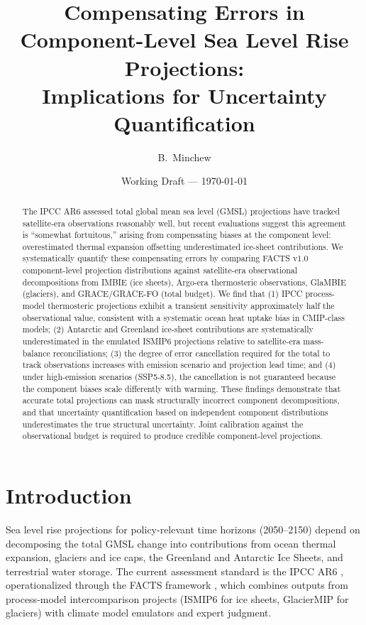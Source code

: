 \documentclass[11pt]{article}
\title{Compensating Errors in Component-Level Sea Level Rise Projections:\\
  Implications for Uncertainty Quantification}
\author{B.\ Minchew}
\date{Working Draft --- \today}
\begin{document}
\maketitle

\begin{abstract}
The IPCC AR6 assessed total global mean sea level (GMSL) projections have tracked satellite-era observations reasonably well, but recent evaluations suggest this agreement is ``somewhat fortuitous,'' arising from compensating biases at the component level: overestimated thermal expansion offsetting underestimated ice-sheet contributions.  We systematically quantify these compensating errors by comparing FACTS v1.0 component-level projection distributions against satellite-era observational decompositions from IMBIE (ice sheets), Argo-era thermosteric observations, GlaMBIE (glaciers), and GRACE/GRACE-FO (total budget).  We find that (1) IPCC process-model thermosteric projections exhibit a transient sensitivity approximately half the observational value, consistent with a systematic ocean heat uptake bias in CMIP-class models; (2) Antarctic and Greenland ice-sheet contributions are systematically underestimated in the emulated ISMIP6 projections relative to satellite-era mass-balance reconciliations; (3) the degree of error cancellation required for the total to track observations increases with emission scenario and projection lead time; and (4) under high-emission scenarios (SSP5-8.5), the cancellation is not guaranteed because the component biases scale differently with warming.  These findings demonstrate that accurate total projections can mask structurally incorrect component decompositions, and that uncertainty quantification based on independent component distributions underestimates the true structural uncertainty.  Joint calibration against the observational budget is required to produce credible component-level projections.
\end{abstract}


\section{Introduction}
\label{sec:intro}

Sea level rise projections for policy-relevant time horizons (2050--2150) depend on decomposing the total GMSL change into contributions from ocean thermal expansion, glaciers and ice caps, the Greenland and Antarctic Ice Sheets, and terrestrial water storage.  The current assessment standard is the IPCC AR6 \citep{fox-kemper2021}, operationalized through the FACTS framework \citep{kopp2023facts}, which combines outputs from process-model intercomparison projects (ISMIP6 for ice sheets, GlacierMIP for glaciers) with climate model emulators and expert judgment.
\end{document}
